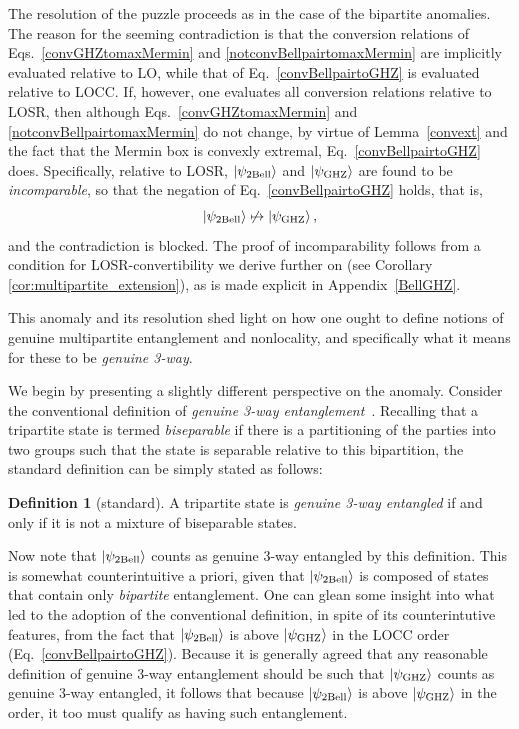 \documentclass[12pt]{article}
\newcommand{\ket}[1]{\left| #1 \right>}
\newcommand{\beq}{\begin{equation}}
\newcommand{\eeq}{\end{equation}}
\theoremstyle{plain}
\theoremstyle{definition}
\newtheorem{defn}{Definition}
\begin{document}
The resolution of the puzzle proceeds as in the case of the bipartite anomalies.  The reason for the seeming contradiction is that the conversion relations of Eqs.~\eqref{convGHZtomaxMermin} and \eqref{notconvBellpairtomaxMermin} are implicitly evaluated relative to LO, 
while that of Eq.~\eqref{convBellpairtoGHZ} is evaluated relative to LOCC.  If, however, one evaluates 
all conversion relations
relative to LOSR,
 then although Eqs.~\eqref{convGHZtomaxMermin} and \eqref{notconvBellpairtomaxMermin} do not change, by virtue of Lemma~\ref{convext} and the fact that the Mermin box is convexly extremal,
Eq.~\eqref{convBellpairtoGHZ} does.  Specifically, relative to LOSR, 
  $\ket{\psi_{\rm 2Bell}}$ and $\ket{\psi_{\rm GHZ}}$ are found to be {\em incomparable}, so that the negation of Eq.~\eqref{convBellpairtoGHZ} holds, that is,
\beq\label{noconvBellGHZ}
\ket{\psi_{\rm 2Bell}} \not\mapsto \ket{\psi_{\rm GHZ}},
\eeq
and the contradiction is blocked. The proof of incomparability follows from a condition for LOSR-convertibility we derive further on (see Corollary \ref{cor:multipartite_extension}),
as is made explicit in Appendix~\ref{BellGHZ}.

This anomaly and its resolution shed light on how one ought to define notions of genuine multipartite entanglement and nonlocality, and specifically what it means for these to be {\em genuine 3-way}.

We begin by presenting a slightly different perspective on the anomaly.
Consider the conventional definition of {\em genuine 3-way entanglement}~\cite{kProducibleEntanglement,EntanglementManyBody}.  Recalling that a tripartite state is termed {\em biseparable} if there is a partitioning of the parties into two groups such that the state is separable relative to this bipartition, the standard definition can
be simply stated as follows: 
\begin{defn}[standard]
A tripartite state is {\em genuine 3-way entangled} if and only if it is not a mixture of biseparable states.
\end{defn}

Now note that $\ket{\psi_{\rm 2Bell}}$ counts as genuine 3-way entangled by this definition.  This is somewhat counterintuitive a priori, given that $\ket{\psi_{\rm 2Bell}}$ is composed of states that contain only {\em bipartite} entanglement.  One can glean some insight into what led to the adoption of the conventional definition, in spite of its counterintutive features, from the fact that $\ket{\psi_{\rm 2Bell}}$ is above $\ket{\psi_{\rm GHZ}}$ in the LOCC order (Eq.~\eqref{convBellpairtoGHZ}).  Because it is generally agreed that any reasonable
 definition of genuine 3-way entanglement should be such that $\ket{\psi_{\rm GHZ}}$ counts as genuine 3-way entangled, it follows that because $\ket{\psi_{\rm 2Bell}}$ is above $\ket{\psi_{\rm GHZ}}$ in the order, it  too must qualify as having such entanglement.
\end{document}
